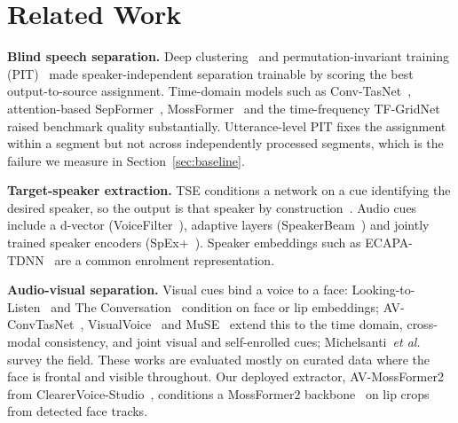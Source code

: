 \documentclass[conference]{IEEEtran}
\begin{document}
\section{Related Work}

\textbf{Blind speech separation.} Deep clustering~\cite{hershey2016deep} and permutation-invariant training (PIT)~\cite{yu2017pit,kolbaek2017upit} made speaker-independent separation trainable by scoring the best output-to-source assignment. Time-domain models such as Conv-TasNet~\cite{luo2019convtasnet}, attention-based SepFormer~\cite{subakan2021sepformer}, MossFormer~\cite{zhao2023mossformer,zhao2024mossformer2} and the time-frequency TF-GridNet~\cite{wang2023tfgridnet} raised benchmark quality substantially. Utterance-level PIT fixes the assignment within a segment but not across independently processed segments, which is the failure we measure in Section~\ref{sec:baseline}.

\textbf{Target-speaker extraction.} TSE conditions a network on a cue identifying the desired speaker, so the output is that speaker by construction~\cite{zmolikova2023overview}. Audio cues include a d-vector (VoiceFilter~\cite{wang2019voicefilter}), adaptive layers (SpeakerBeam~\cite{zmolikova2019speakerbeam}) and jointly trained speaker encoders (SpEx+~\cite{ge2020spexplus}). Speaker embeddings such as ECAPA-TDNN~\cite{desplanques2020ecapa} are a common enrolment representation.

\textbf{Audio-visual separation.} Visual cues bind a voice to a face: Looking-to-Listen~\cite{ephrat2018looking} and The Conversation~\cite{afouras2018conversation} condition on face or lip embeddings; AV-ConvTasNet~\cite{wu2019avconvtasnet}, VisualVoice~\cite{gao2021visualvoice} and MuSE~\cite{pan2021muse} extend this to the time domain, cross-modal consistency, and joint visual and self-enrolled cues; Michelsanti~\textit{et al.}~\cite{michelsanti2021overview} survey the field. These works are evaluated mostly on curated data where the face is frontal and visible throughout. Our deployed extractor, AV-MossFormer2 from ClearerVoice-Studio~\cite{clearervoice}, conditions a MossFormer2 backbone~\cite{zhao2024mossformer2} on lip crops from detected face tracks.
\end{document}
